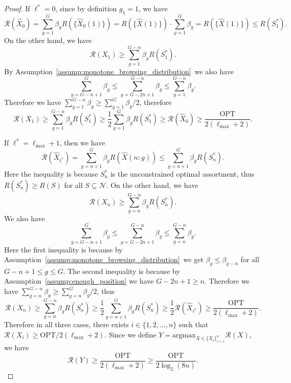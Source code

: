 \documentclass[10pt,a4paper]{amsart}
\begin{document}
\begin{proof}
If $\ell^*=0$, since by definition $g_1=1$, we have
\begin{equation*}
\mathcal{R}(\hat{X}_0)=\sum_{g=1}^G \beta_g R(\{\hat{X}_0(1)\})=R(\{\hat{X}(1)\})\cdot\sum_{g=1}^G\beta_g=R(\{\hat{X}(1)\})\leq R(S_1^*).
\end{equation*}
On the other hand, we have
\begin{equation*}
\mathcal{R}(X_1)\geq \sum_{g=1}^{G-n}\beta_gR(S_1^*).
\end{equation*}
By Assumption~\ref{assump:monotone_browsing_distribution}~we also have
\begin{equation*}
\sum_{g=G-n+1}^G\beta_g\leq \sum_{g=G-2n+1}^{G-n}\beta_g\leq \sum_{g=1}^{G-n}\beta_g.
\end{equation*}
Therefore we have $\sum_{g=1}^{G-n}\beta_g\geq \sum_{g=1}^G\beta_g/2$, therefore
\begin{equation*}
\mathcal{R}(X_1)\geq \sum_{g=1}^{G-n}\beta_g R(S_1^*)\geq \dfrac{1}{2}\sum_{g=1}^G \beta_gR(S_1^*)\geq \mathcal{R}(\hat{X}_0)\geq \dfrac{\text{OPT}}{2(\ell_{\max}+2)}.
\end{equation*}

If $\ell^*=\ell_{\max}+1$, then we have
\begin{equation*}
\mathcal{R}(\hat{X}_{\ell^*})=\sum_{g=n+1}^G \beta_gR(\hat{X}(n:g))\leq \sum_{g=n+1}^G\beta_gR(S_n^*).
\end{equation*}
Here the inequality is because $S_n^*$ is the unconstrained optimal assortment, thus $R(S_n^*)\geq R(S)$ for all $S\subseteq\mathcal{N}$. On the other hand, we have
\begin{equation*}
\mathcal{R}(X_n)\geq \sum_{g=n}^{G-n}\beta_g R(S_n^*).
\end{equation*}
We also have
\begin{equation*}
\sum_{g=G-n+1}^{G}\beta_g\leq \sum_{g=G-2n+1}^{G-n}\beta_g\leq \sum_{g=n}^{G-n}\beta_g.
\end{equation*}
Here the first inequality is because by Assumption~\ref{assump:monotone_browsing_distribution}~we get $\beta_g\leq \beta_{g-n}$ for all $G-n+1\leq g\leq G$. The second inequality is because by Assumption~\ref{assump:enough_position} we have $G-2n+1\geq n$. Therefore we have $\sum_{g=n}^{G-n}\beta_g\geq \sum_{g=n}^G \beta_g/2$, thus
\begin{equation*}
\mathcal{R}(X_n)\geq \sum_{g=n}^{G-n}\beta_g R(S_n^*)\geq \dfrac{1}{2}\sum_{g=n+1}^G \beta_gR(S_n^*)\geq \dfrac{1}{2}\mathcal{R}(\hat{X}_{\ell^*})\geq \dfrac{\text{OPT}}{2(\ell_{\max}+2)}.
\end{equation*}
Therefore in all three cases, there exists $i\in\{1,2,\dots,n\}$ such that $\mathcal{R}(X_i)\geq \text{OPT}/2(\ell_{\max}+2)$. Since we define $Y=\mathrm{argmax}_{X\in\{X_i\}_{i=1}^n}\mathcal{R}(X)$, we have
\begin{equation*}
\mathcal{R}(Y)\geq \dfrac{\text{OPT}}{2(\ell_{\max}+2)}\geq \dfrac{\text{OPT}}{2\log_2(8n)}.
\end{equation*}


\end{proof}
\end{document}
